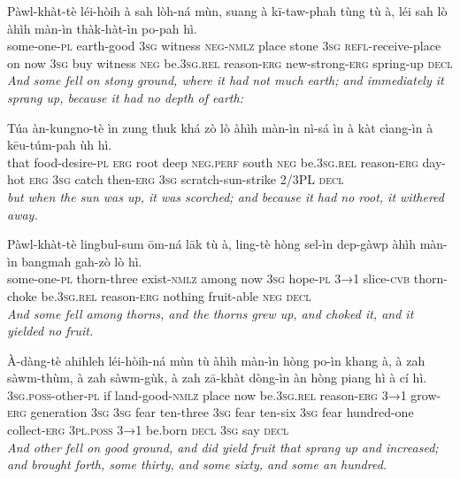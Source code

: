 \documentclass[11pt,a4paper]{article}
\begin{document}
\begin{exe}
\gll Pàwl-khàt-tè léi-hòih à sah lòh-ná mùn, suang à kī-taw-phah tùng tù à, léi sah lò àhìh màn-ìn thàk-hàt-ìn po-pah hì. \\
     some-one-\textsc{pl} earth-good \textsc{3sg} witness \textsc{neg}-\textsc{nmlz} place stone \textsc{3sg} \textsc{refl}-receive-place on now \textsc{3sg} buy witness \textsc{neg} be.\textsc{3sg}.\textsc{rel} reason-\textsc{erg} new-strong-\textsc{erg} spring-up \textsc{decl} \\
\glt \textcolor{kjvcolor}{\textit{And some fell on stony ground, where it had not much earth; and immediately it sprang up, because it had no depth of earth:}}

\gll Túa àn-kungno-tè ìn zung thuk khá zò lò àhìh màn-ìn nì-sá ìn à kàt cìang-ìn à kēu-túm-pah ùh hì. \\
     that food-desire-\textsc{pl} \textsc{erg} root deep \textsc{neg}.\textsc{perf} south \textsc{neg} be.\textsc{3sg}.\textsc{rel} reason-\textsc{erg} day-hot \textsc{erg} \textsc{3sg} catch then-\textsc{erg} \textsc{3sg} scratch-sun-strike 2/3PL \textsc{decl} \\
\glt \textcolor{kjvcolor}{\textit{but when the sun was up, it was scorched; and because it had no root, it withered away.}}

\gll Pàwl-khàt-tè lingbul-sum ōm-ná lāk tù à, ling-tè hòng sel-ìn dep-gàwp àhìh màn-ìn bangmah gah-zò lò hì. \\
     some-one-\textsc{pl} thorn-three exist-\textsc{nmlz} among now \textsc{3sg} hope-\textsc{pl} \textsc{3→1} slice-\textsc{cvb} thorn-choke be.\textsc{3sg}.\textsc{rel} reason-\textsc{erg} nothing fruit-able \textsc{neg} \textsc{decl} \\
\glt \textcolor{kjvcolor}{\textit{And some fell among thorns, and the thorns grew up, and choked it, and it yielded no fruit.}}

\gll À-dàng-tè ahihleh léi-hòih-ná mùn tù àhìh màn-ìn hòng po-ìn khang à, à zah sàwm-thùm, à zah sàwm-gùk, à zah zā-khàt dòng-ìn àn hòng piang hì à cí hì. \\
     \textsc{3sg}.\textsc{poss}-other-\textsc{pl} if land-good-\textsc{nmlz} place now be.\textsc{3sg}.\textsc{rel} reason-\textsc{erg} \textsc{3→1} grow-\textsc{erg} generation \textsc{3sg} \textsc{3sg} fear ten-three \textsc{3sg} fear ten-six \textsc{3sg} fear hundred-one collect-\textsc{erg} \textsc{3pl}.\textsc{poss} \textsc{3→1} be.born \textsc{decl} \textsc{3sg} say \textsc{decl} \\
\glt \textcolor{kjvcolor}{\textit{And other fell on good ground, and did yield fruit that sprang up and increased; and brought forth, some thirty, and some sixty, and some an hundred.}}


\end{exe}
\end{document}
